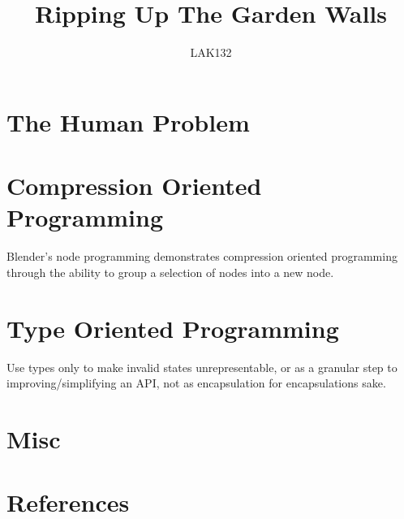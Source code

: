 \documentclass{article}
\title{Ripping Up The Garden Walls}
\author{LAK132}
\begin{document}
\maketitle

\tableofcontents

\section[the-human-problem]{The Human Problem}

\cite{augmentating-human-intellect}

\cite{mother-of-all-demos}

\cite{augmentation-of-douglas-engelbart}

\cite{written-for-eyes}

\cite{the-future-of-programming}

\section[compression-oriented-programming]{Compression Oriented Programming}

\cite{designing-and-evaluating-reusable-components}

\cite{immediate-mode-gui}

\cite{five-second-stall}

\cite{semantic-compression}

\cite{complexity-and-granularity}

\cite{thirty-million-line-problem}

\cite{twitter-and-visual-studio-rant}

\cite{how-fast-should-an-unoptimised-terminal-run}

\cite{simple-code-high-performance}

\cite{where-does-bad-code-come-from}

\cite{the-only-unbreakable-law}

Blender's node programming demonstrates compression oriented programming
through the ability to group a selection of nodes into a new node.

\section[type-oriented-programming]{Type Oriented Programming}

Use types only to make invalid states unrepresentable,
or as a granular step \cite{complexity-and-granularity} to
improving/simplifying an API,
not as encapsulation for encapsulations sake.

\section[misc]{Misc}

\cite{100-rabbits}

\cite{xxiivv}

\cite{plan-9}

\newpage

\section[references]{References}



\end{document}
